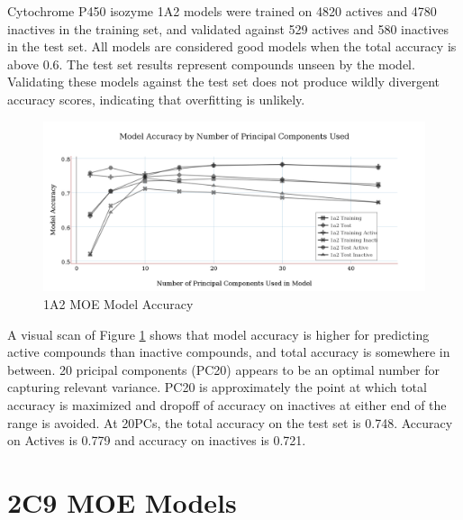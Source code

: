 Cytochrome P450 isozyme 1A2 models were trained on 4820 actives and 4780 inactives in the training set, and validated against 529 actives and 580 inactives in the test set. All models are considered good models when the total accuracy is above 0.6. The test set results represent compounds unseen by the model. Validating these models against the test set does not produce wildly divergent accuracy scores, indicating that overfitting is unlikely. 

\begin{figure}[H]
\includegraphics[width=1\textwidth]{../img/1a2_moe_model_accuracy.png}
\caption{1A2 MOE Model Accuracy}
\label{fig:1a2}
\end{figure}

A visual scan of Figure \ref{fig:1a2} shows that model accuracy is higher for predicting active compounds than inactive compounds, and total accuracy is somewhere in between. 20 pricipal components (PC20) appears to be an optimal number for capturing relevant variance.
PC20 is approximately the point at which total accuracy is maximized and dropoff of accuracy on inactives at either end of the range is avoided.
At 20PCs, the total accuracy on the test set is 0.748. Accuracy on Actives is 0.779 and accuracy on inactives is 0.721.


\section{2C9 MOE Models}

